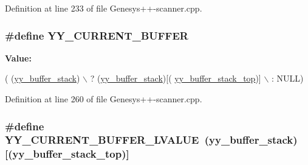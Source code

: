 Definition at line 233 of file Genesys++-\/scanner.\-cpp.

\hypertarget{_genesys_09_09-scanner_8cpp_aa093d500a6330d06d8e4760c494fac33}{
\subsubsection[{Y\-Y\-\_\-\-C\-U\-R\-R\-E\-N\-T\-\_\-\-B\-U\-F\-F\-E\-R}]{\setlength{\rightskip}{0pt plus 5cm}\#define Y\-Y\-\_\-\-C\-U\-R\-R\-E\-N\-T\-\_\-\-B\-U\-F\-F\-E\-R}}\label{_genesys_09_09-scanner_8cpp_aa093d500a6330d06d8e4760c494fac33}
{\bfseries Value\-:}
\begin{DoxyCode}
( (\hyperlink{_genesys_09_09-scanner_8cpp_a34b6ab3a3061471b6604dba48e47a101}{yy\_buffer\_stack}) \(\backslash\)
                          ? (\hyperlink{_genesys_09_09-scanner_8cpp_a34b6ab3a3061471b6604dba48e47a101}{yy\_buffer\_stack})[(
      \hyperlink{_genesys_09_09-scanner_8cpp_ae54779a12769204c826899d0531e40e6}{yy\_buffer\_stack\_top})] \(\backslash\)
                          : NULL)
\end{DoxyCode}


Definition at line 260 of file Genesys++-\/scanner.\-cpp.

\hypertarget{_genesys_09_09-scanner_8cpp_a817a6a24af62508b5a35f4bed5f56a2e}{
\subsubsection[{Y\-Y\-\_\-\-C\-U\-R\-R\-E\-N\-T\-\_\-\-B\-U\-F\-F\-E\-R\-\_\-\-L\-V\-A\-L\-U\-E}]{\setlength{\rightskip}{0pt plus 5cm}\#define Y\-Y\-\_\-\-C\-U\-R\-R\-E\-N\-T\-\_\-\-B\-U\-F\-F\-E\-R\-\_\-\-L\-V\-A\-L\-U\-E~({\bf yy\-\_\-buffer\-\_\-stack})\mbox{[}({\bf yy\-\_\-buffer\-\_\-stack\-\_\-top})\mbox{]}}}\label{_genesys_09_09-scanner_8cpp_a817a6a24af62508b5a35f4bed5f56a2e}


